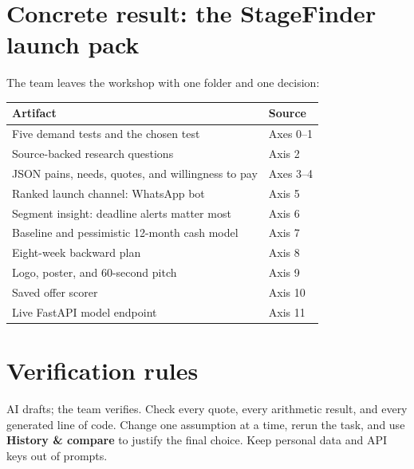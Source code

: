 \documentclass[11pt,a4paper]{article}
\begin{document}
\section{Concrete result: the StageFinder launch pack}
The team leaves the workshop with one folder and one decision:
\begin{table}[h]
\centering
\begin{tabular}{ll}
\hline
Artifact & Source \\
\hline
Five demand tests and the chosen test & Axes 0--1 \\
Source-backed research questions & Axis 2 \\
JSON pains, needs, quotes, and willingness to pay & Axes 3--4 \\
Ranked launch channel: WhatsApp bot & Axis 5 \\
Segment insight: deadline alerts matter most & Axis 6 \\
Baseline and pessimistic 12-month cash model & Axis 7 \\
Eight-week backward plan & Axis 8 \\
Logo, poster, and 60-second pitch & Axis 9 \\
Saved offer scorer & Axis 10 \\
Live FastAPI model endpoint & Axis 11 \\
\hline
\end{tabular}
\end{table}

\section{Verification rules}
AI drafts; the team verifies. Check every quote, every arithmetic result, and every generated line of code. Change one assumption at a time, rerun the task, and use \textbf{History \& compare} to justify the final choice. Keep personal data and API keys out of prompts.
\end{document}
